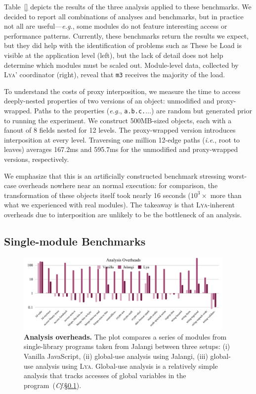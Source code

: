 \documentclass[letterpaper,twocolumn,10pt]{article}
\def\eg{{\em e.g.}, }
\def\ie{{\em i.e.}, }
\newcommand{\ttt}[1]{\texttt{#1}}
\newcommand{\cf}[1]{(\emph{Cf}.\S\ref{#1})}
\newcommand{\sys}{{\scshape Lya}\xspace}
\begin{document}
Table~\ref{} depicts the results of the three analysis applied to these benchmarks.
We decided to report all combinations of analyses and benchmarks, but in practice not all are useful---\eg some modules do not feature interesting access or performance patterns.
Currently, these benchmarks return the results we expect, but they did help with the identification of problems such as 
These be
Load is visible at the application level (left), but the lack of detail does not help determine which modules must be scaled out.
Module-level data, collected by \sys' coordinator (right), reveal that \ttt{m3} receives the majority of the load.

To understand the costs of proxy interposition, we measure the time to access deeply-nested properties of two versions of an object:
  unmodified and proxy-wrapped.
Paths to the properties (\eg \ttt{a.b.c.$\ldots$}) are random but generated prior to running the experiment.
We construct 500MB-sized objects, each with a fanout of 8 fields nested for 12 levels.
The proxy-wrapped version introduces interposition at every level.
Traversing one million 12-edge paths (\ie root to leaves) averages 167.2ms and 595.7ms for the unmodified and proxy-wrapped versions, respectively.

We emphasize that this is an artificially constructed benchmark stressing worst-case overheads nowhere near an normal execution:
  for comparison, the transformation of these objects itself took nearly 16 seconds ($10^3\times$ more than what we experienced with real modules).
The takeaway is that \sys-inherent overheads due to interposition are unlikely to be the bottleneck of an analysis.

\subsection{Single-module Benchmarks}
\label{meso}

\begin{figure}[t]
  \centering
   \includegraphics[width=0.95\textwidth]{./figs/meso.pdf}
  \caption{
    \textbf{Analysis overheads.}
    The plot compares a series of modules from single-library programs taken from Jalangi between three setups:
		(i) Vanilla JavaScript, (ii) global-use analysis using Jalangi, (iii) global-use analysis using \sys.
    Global-use analysis is a relatively simple analysis that tracks accesses of global variables in the program~\cf{meso}.
  }
  \label{fig:meso}
  \vspace{-3mm}
\end{figure}
\end{document}
